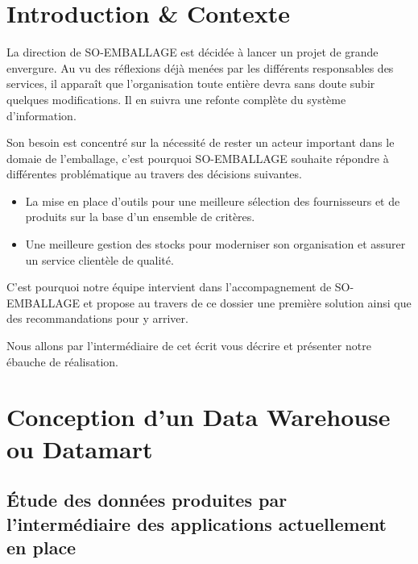 \section{Introduction \& Contexte}

La direction de SO-EMBALLAGE est décidée à lancer un projet de grande envergure. Au vu des réflexions déjà menées par les différents responsables des services, il apparaît que l’organisation toute entière devra sans doute subir quelques modifications. Il en suivra une refonte complète du système d’information.

Son besoin est concentré sur la nécessité de rester un acteur important dans le domaie de l'emballage, c'est pourquoi SO-EMBALLAGE souhaite répondre à différentes problématique au travers des décisions suivantes.   

\begin{itemize}[label=\textbullet, font=\LARGE \color{listGreen}]	
	\item La mise en place d’outils pour une meilleure sélection des fournisseurs et de produits sur la base d’un ensemble de critères. 
	\item Une meilleure gestion des stocks pour moderniser son organisation et assurer un service clientèle de qualité. 
\end{itemize} 

C’est pourquoi notre équipe intervient dans l’accompagnement de SO-EMBALLAGE et propose au travers de ce dossier une première solution ainsi que des recommandations pour y arriver.    

Nous allons par l'intermédiaire de cet écrit vous décrire et présenter notre ébauche de réalisation.    


\newpage

\section{Conception d'un Data Warehouse ou Datamart}

\subsection{Étude des données produites par l’intermédiaire des applications actuellement en place}

